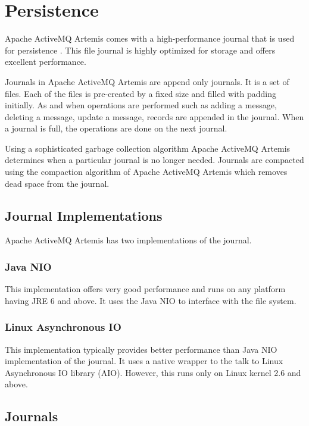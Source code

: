 \section{Persistence}

Apache ActiveMQ Artemis comes with a high-performance journal that is used for persistence \parencite{artemis_persistence}. This file journal is highly optimized for storage and offers excellent performance.

Journals in Apache ActiveMQ Artemis are append only journals. It is a set of files. Each of the files is pre-created by a fixed size and filled with padding initially. As and when operations are performed such as adding a message, deleting a message, update a message, records are appended in the journal. When a journal is full, the operations are done on the next journal.

Using a sophisticated garbage collection algorithm Apache ActiveMQ Artemis determines when a particular journal is no longer needed. Journals are compacted using the compaction algorithm of Apache ActiveMQ Artemis which removes dead space from the journal.

\subsection{Journal Implementations}

Apache ActiveMQ Artemis has two implementations of the journal.

\subsubsection{Java NIO}

This implementation offers very good performance and runs on any platform having JRE 6 and above. It uses the Java NIO to interface with the file system.

\subsubsection{Linux Asynchronous IO}

This implementation typically provides better performance than Java NIO implementation of the journal. It uses a native wrapper to the talk to Linux Asynchronous IO library (AIO). However, this runs only on Linux kernel 2.6 and above. 

\subsection{Journals}

